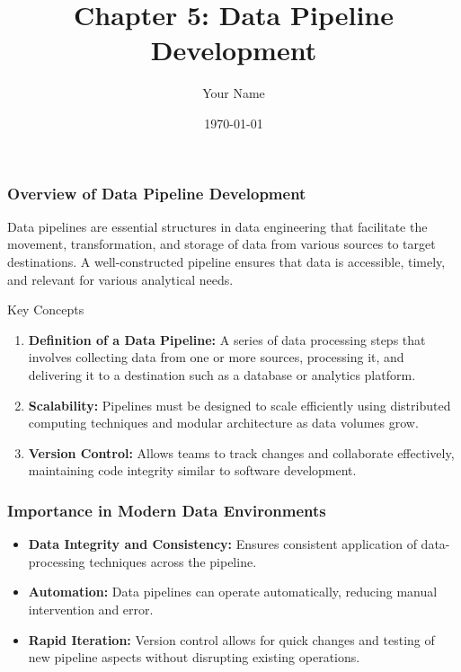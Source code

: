 \documentclass{beamer}
\title{Chapter 5: Data Pipeline Development}
\author{Your Name}
\institute{Your Institution}
\date{\today}
\begin{document}
\frame{\titlepage}

\begin{frame}[fragile]
    \titlepage
\end{frame}

\begin{frame}[fragile]
    \frametitle{Overview of Data Pipeline Development}
    Data pipelines are essential structures in data engineering that facilitate the movement, transformation, and storage of data from various sources to target destinations. A well-constructed pipeline ensures that data is accessible, timely, and relevant for various analytical needs.

    \begin{block}{Key Concepts}
        \begin{enumerate}
            \item \textbf{Definition of a Data Pipeline:} A series of data processing steps that involves collecting data from one or more sources, processing it, and delivering it to a destination such as a database or analytics platform.
            \item \textbf{Scalability:} Pipelines must be designed to scale efficiently using distributed computing techniques and modular architecture as data volumes grow.
            \item \textbf{Version Control:} Allows teams to track changes and collaborate effectively, maintaining code integrity similar to software development.
        \end{enumerate}
    \end{block}
\end{frame}

\begin{frame}[fragile]
    \frametitle{Importance in Modern Data Environments}
    \begin{itemize}
        \item \textbf{Data Integrity and Consistency:} Ensures consistent application of data-processing techniques across the pipeline.
        \item \textbf{Automation:} Data pipelines can operate automatically, reducing manual intervention and error.
        \item \textbf{Rapid Iteration:} Version control allows for quick changes and testing of new pipeline aspects without disrupting existing operations.
    \end{itemize}
\end{frame}
\end{document}
